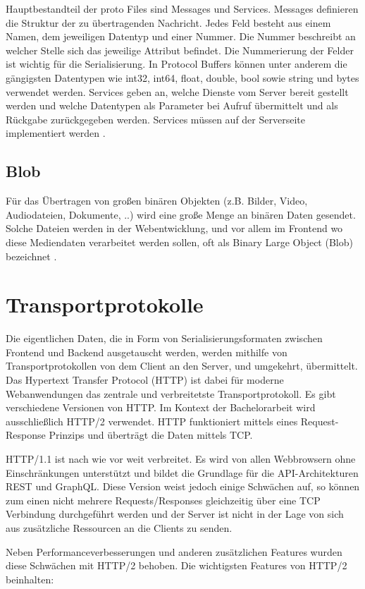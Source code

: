 Hauptbestandteil der proto Files sind Messages und Services.
Messages definieren die Struktur der zu übertragenden Nachricht. Jedes Feld besteht aus einem Namen, dem jeweiligen Datentyp und einer Nummer. Die Nummer beschreibt an welcher Stelle sich das jeweilige Attribut befindet. Die Nummerierung der Felder ist wichtig für die Serialisierung. In Protocol Buffers können unter anderem die gängigsten Datentypen wie int32, int64, float, double, bool sowie string und bytes verwendet werden.
Services geben an, welche Dienste vom Server bereit gestellt werden und welche Datentypen als Parameter bei Aufruf übermittelt und als Rückgabe zurückgegeben werden. Services müssen auf der Serverseite implementiert werden \parencite{protobufdocs}.


\subsection{Blob}
Für das Übertragen von großen binären Objekten (z.B. Bilder, Video, Audiodateien, Dokumente, ..) wird eine große Menge an binären Daten gesendet. Solche Dateien werden in der Webentwicklung, und vor allem im Frontend wo diese Mediendaten verarbeitet werden sollen, oft als Binary Large Object (Blob) bezeichnet \parencite{w3c-fileapi}.

\section{Transportprotokolle}
Die eigentlichen Daten, die in Form von Serialisierungsformaten zwischen Frontend und Backend ausgetauscht werden, werden mithilfe von Transportprotokollen von dem Client an den Server, und umgekehrt, übermittelt. Das Hypertext Transfer Protocol (HTTP) ist dabei für moderne Webanwendungen das zentrale und verbreitetste Transportprotokoll. Es gibt verschiedene Versionen von HTTP. Im Kontext der Bachelorarbeit wird ausschließlich HTTP/2 verwendet. HTTP funktioniert mittels eines Request-Response Prinzips und überträgt die Daten mittels TCP.

HTTP/1.1 ist nach wie vor weit verbreitet. Es wird von allen Webbrowsern ohne Einschränkungen unterstützt und bildet die Grundlage für die API-Architekturen REST und GraphQL. Diese Version weist jedoch einige Schwächen auf, so können zum einen nicht mehrere Requests/Responses gleichzeitig über eine TCP Verbindung durchgeführt werden und der Server ist nicht in der Lage von sich aus zusätzliche Ressourcen an die Clients zu senden. 

Neben Performanceverbesserungen und anderen zusätzlichen Features wurden diese Schwächen mit HTTP/2 behoben.
Die wichtigsten Features von HTTP/2 beinhalten:

